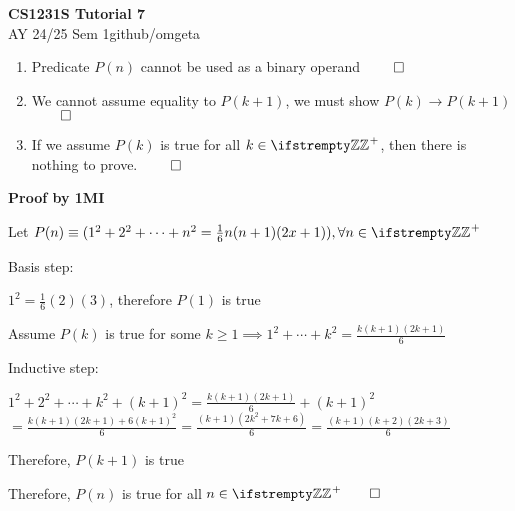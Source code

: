 \documentclass[12pt, a4paper]{article}
\newcommand{\mytitle}{CS1231S Tutorial 7}
\newcommand{\myauthor}{github/omgeta}
\newcommand{\mydate}{AY 24/25 Sem 1}
\begin{document}
\raggedright
\footnotesize
\begin{center}
{\normalsize{\textbf{\mytitle}}} \\
{\footnotesize{\mydate\hspace{2pt}\textemdash\hspace{2pt}\myauthor}}
\end{center}
\begin{enumerate}[Q\arabic*.]
  \item 
    \begin{enumerate}[(\alph*)]
      \item Predicate $P(n)$ cannot be used as a binary operand $\qed$
      \item We cannot assume equality to $P(k+1)$, we must show $P(k) \rightarrow P(k+1)$ $\qed$ 
      \item If we assume $P(k)$ is true for all $k\in\ZZ^+$, then there is nothing to prove. $\qed$
    \end{enumerate}
  
  \item \textbf{Proof by 1MI}
    \begin{enumproof}
    \item Let $P(n) \equiv (1^2+2^2+\cdots+n^2=\frac{1}{6}n(n+1)(2x+1)), \forall n\in\ZZ^+$
    \item Basis step: 
      \begin{enumproof}
      \item $1^2 = \frac{1}{6}(2)(3)$, therefore $P(1)$ is true
      \end{enumproof}
    \item Assume $P(k)$ is true for some $k\geq1 \implies 1^2+\cdots+k^2 = \frac{k(k+1)(2k+1)}{6}$
    \item Inductive step: 
      \begin{enumproof}
      \item $1^2+2^2+\cdots+k^2+(k+1)^2 = \frac{k(k+1)(2k+1)}{6}+(k+1)^2$ \\$= \frac{k(k+1)(2k+1)+6(k+1)^2}{6} = \frac{(k+1)(2k^2 + 7k + 6)}{6} = \frac{(k+1)(k+2)(2k+3)}{6}$
      \item Therefore, $P(k+1)$ is true
      \end{enumproof}
    \item Therefore, $P(n)$ is true for all $n \in \ZZ^+ \qed$
    \end{enumproof}


\end{enumerate}
\end{document}
